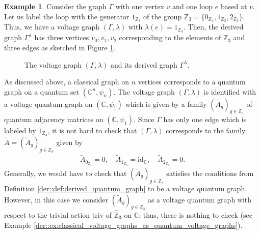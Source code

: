 \documentclass{amsart}
\newcommand{\C}{\mathbb{C}}
\newcommand{\Z}{\mathbb{Z}}
\theoremstyle{definition}
\newtheorem{example}[thm]{Example}
\theoremstyle{definition}
\begin{document}
\begin{example}
    Consider the graph $\Gamma$ with one vertex $v$ and one loop $e$ based at $v$. Let us label the loop with the generator $1_{\Z_3}$ of the group $\Z_3 = \{0_{\Z_3}, 1_{\Z_3}, 2_{\Z_3}\}$. Thus, we have a voltage graph $(\Gamma, \lambda)$ with $\lambda(e) = 1_{\Z_3}$. Then, the derived graph $\Gamma^\lambda$ has three vertices $v_0, v_1, v_2$ corresponding to the elements of $\Z_3$ and three edges as sketched in Figure \ref{der::fig:voltage_graph_example}.
    \begin{figure}[bt]
        \caption{The voltage graph $(\Gamma, \lambda)$ and its derived graph $\Gamma^\lambda$.}
        \label{der::fig:voltage_graph_example}
    \end{figure}

    As discussed above, a classical graph on $n$ vertices corresponds to a quantum graph on a quantum set $(\C^n, \psi_n)$.
    The voltage graph $(\Gamma, \lambda)$ is identified with a voltage quantum graph on $(\C, \psi_1)$ which is given by a family $(\tilde{A}_g)_{g \in \Z_3}$ of quantum adjacency matrices on $(\C, \psi_1)$. Since $\Gamma$ has only one edge which is labeled by $1_{\Z_3}$, it is not hard to check that $(\Gamma, \lambda)$ corresponds to the family $\tilde{A} = (\tilde{A}_g)_{g \in \Z_3}$ given by
    \begin{align*}
        \tilde{A}_{0_{\Z_3}} = 0, \quad \tilde{A}_{1_{\Z_3}} = \mathrm{id}_{\C}, \quad \tilde{A}_{2_{\Z_3}} = 0.
    \end{align*}
    Generally, we would have to check that $(\tilde{A}_g)_{g \in \Z_3}$ satisfies the conditions from Definition \ref{der::def:derived_quantum_graph} to be a voltage quantum graph. However, in this case we consider $(\tilde{A}_g)_{g \in \Z_3}$ as a voltage quantum graph with respect to the trivial action $\mathrm{triv}$ of $\hat{\Z}_3$ on $\C$; thus, there is nothing to check (see Example \ref{der::ex:classical_voltage_graphs_as_quantum_voltage_graphs}).


\end{example}
\end{document}
